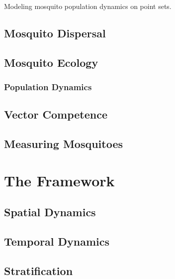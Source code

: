 \documentclass[
]{book}
\begin{document}
Modeling mosquito population dynamics on point sets.

\hypertarget{mosquito-dispersal-1}{%
\chapter{Mosquito Dispersal}\label{mosquito-dispersal-1}}

\hypertarget{mosquito-ecology-2}{%
\chapter{Mosquito Ecology}\label{mosquito-ecology-2}}

\hypertarget{population-dynamics}{%
\section{Population Dynamics}\label{population-dynamics}}

\hypertarget{vector-competence}{%
\chapter{Vector Competence}\label{vector-competence}}

\hypertarget{measuring-mosquitoes}{%
\chapter{Measuring Mosquitoes}\label{measuring-mosquitoes}}

\hypertarget{part-the-framework}{%
\part{The Framework}\label{part-the-framework}}

\hypertarget{spatial-dynamics}{%
\chapter{Spatial Dynamics}\label{spatial-dynamics}}

\hypertarget{temporal-dynamics}{%
\chapter{Temporal Dynamics}\label{temporal-dynamics}}

\hypertarget{stratification}{%
\chapter{Stratification}\label{stratification}}
\end{document}
